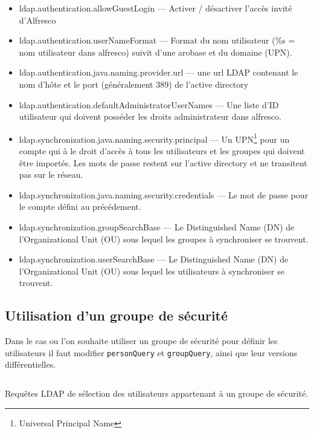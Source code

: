 \begin{itemize} 
\item ldap.authentication.allowGuestLogin — Activer / désactiver l'accès invité d'Alfresco

\item ldap.authentication.userNameFormat — Format du nom utilisateur (\%s = nom utilisateur dans alfresco) suivit d'une arobase et du domaine (UPN).

\item ldap.authentication.java.naming.provider.url — une url LDAP contenant le nom d'hôte et le port (généralement 389) de l'active directory

\item ldap.authentication.defaultAdministratorUserNames — Une liste d'ID utilisateur qui doivent posséder les droits administrateur dans alfresco.

\item ldap.synchronization.java.naming.security.principal — Un UPN\footnote{Universal Principal Name} pour un compte qui à le droit d'accès à tous les utilisateurs et les groupes qui doivent être importés. Les mots de passe restent sur l'active directory et ne transitent pas sur le réseau.

\item ldap.synchronization.java.naming.security.credentials — Le mot de passe pour le compte défini au précédement.

\item ldap.synchronization.groupSearchBase — Le Distinguished Name (DN) de l'Organizational Unit (OU) sous lequel les groupes à synchroniser se trouvent.
\item ldap.synchronization.userSearchBase —  Le Distinguished Name (DN) de l'Organizational Unit (OU) sous lequel les utilisateurs à synchroniser se trouvent.
\end{itemize}

\subsection{Utilisation d'un groupe de sécurité}
Dans le cas ou l'on souhaite utiliser un groupe de sécurité pour définir les utilisateurs il faut modifier \verb|personQuery| et \verb|groupQuery|, ainsi que leur versions différentielles.
\begin{codesnippet}
\inputminted[frame=single,linenos,fontsize=\footnotesize]{properties}{extraits/person_queries_CN.properties}
\caption{Requêtes LDAP de sélection des utilisateurs appartenant à un groupe de sécurité.}
\label{conf:ad-person-queries}
\end{codesnippet}

